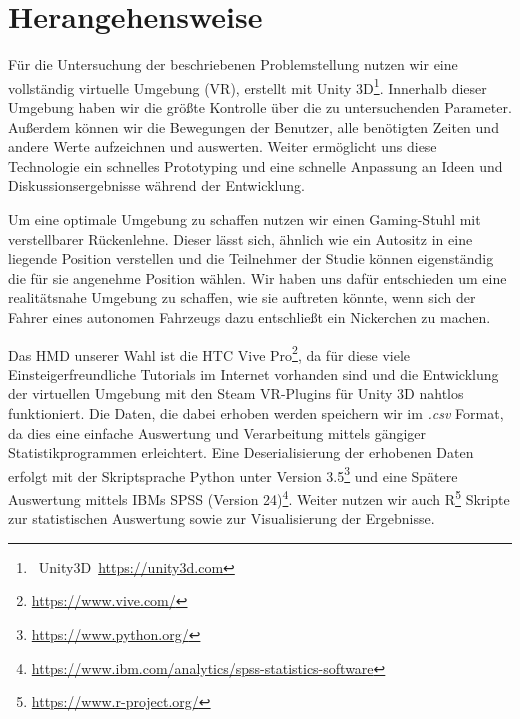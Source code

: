 \section{Herangehensweise}\label{sec:approach}  

Für die Untersuchung der beschriebenen Problemstellung nutzen wir eine vollständig virtuelle Umgebung (VR), erstellt mit Unity 3D\footnote{~Unity3D~\url{https://unity3d.com}}. Innerhalb dieser Umgebung haben wir die größte Kontrolle über die zu untersuchenden Parameter. Außerdem können wir die Bewegungen der Benutzer, alle benötigten Zeiten und andere Werte aufzeichnen und auswerten. Weiter ermöglicht uns diese Technologie ein schnelles Prototyping und eine schnelle Anpassung an Ideen und Diskussionsergebnisse während der Entwicklung.

Um eine optimale Umgebung zu schaffen nutzen wir einen Gaming-Stuhl mit verstellbarer Rückenlehne. Dieser lässt sich, ähnlich wie ein Autositz in eine liegende Position verstellen und die Teilnehmer der Studie können eigenständig die für sie angenehme Position wählen. Wir haben uns dafür entschieden um eine realitätsnahe Umgebung zu schaffen, wie sie auftreten könnte, wenn sich der Fahrer eines autonomen Fahrzeugs dazu entschließt ein Nickerchen zu machen.

Das HMD unserer Wahl ist die HTC Vive Pro\footnote{\url{https://www.vive.com/}}, da für diese viele Einsteigerfreundliche Tutorials im Internet vorhanden sind und die Entwicklung der virtuellen Umgebung mit den Steam VR-Plugins für Unity 3D nahtlos funktioniert. Die Daten, die dabei erhoben werden speichern wir im \textit{.csv} Format, da dies eine einfache Auswertung und Verarbeitung mittels gängiger Statistikprogrammen erleichtert. Eine Deserialisierung der erhobenen Daten erfolgt mit der Skriptsprache Python unter Version 3.5\footnote{\url{https://www.python.org/}} und eine Spätere Auswertung mittels IBMs SPSS (Version 24)\footnote{\url{https://www.ibm.com/analytics/spss-statistics-software}}. Weiter nutzen wir auch R\footnote{\url{https://www.r-project.org/}} Skripte zur statistischen Auswertung sowie zur Visualisierung der Ergebnisse. 
